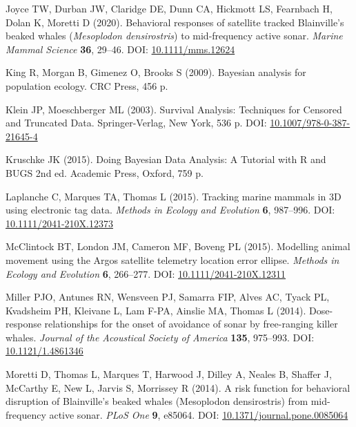\documentclass[
]{article}
\begin{document}
\leavevmode\hypertarget{ref-Joyce2020}{}%
Joyce TW, Durban JW, Claridge DE, Dunn CA, Hickmott LS, Fearnbach H, Dolan K, Moretti D (2020). Behavioral responses of satellite tracked Blainville's beaked whales (\emph{Mesoplodon densirostris}) to mid-frequency active sonar. \emph{Marine Mammal Science} \textbf{36}, 29--46. DOI: \href{https://doi.org/10.1111/mms.12624}{10.1111/mms.12624}

\leavevmode\hypertarget{ref-King2009}{}%
King R, Morgan B, Gimenez O, Brooks S (2009). Bayesian analysis for population ecology. CRC Press, 456 p.

\leavevmode\hypertarget{ref-Klein2003}{}%
Klein JP, Moeschberger ML (2003). Survival Analysis: Techniques for Censored and Truncated Data. Springer-Verlag, New York, 536 p. DOI: \href{https://doi.org/10.1007/978-0-387-21645-4}{10.1007/978-0-387-21645-4}

\leavevmode\hypertarget{ref-Kruschke2010}{}%
Kruschke JK (2015). Doing Bayesian Data Analysis: A Tutorial with R and BUGS 2nd ed. Academic Press, Oxford, 759 p.

\leavevmode\hypertarget{ref-Laplanche2015}{}%
Laplanche C, Marques TA, Thomas L (2015). Tracking marine mammals in 3D using electronic tag data. \emph{Methods in Ecology and Evolution} \textbf{6}, 987--996. DOI: \href{https://doi.org/10.1111/2041-210X.12373}{10.1111/2041-210X.12373}

\leavevmode\hypertarget{ref-McClintock2015}{}%
McClintock BT, London JM, Cameron MF, Boveng PL (2015). Modelling animal movement using the Argos satellite telemetry location error ellipse. \emph{Methods in Ecology and Evolution} \textbf{6}, 266--277. DOI: \href{https://doi.org/10.1111/2041-210X.12311}{10.1111/2041-210X.12311}

\leavevmode\hypertarget{ref-Miller2014}{}%
Miller PJO, Antunes RN, Wensveen PJ, Samarra FIP, Alves AC, Tyack PL, Kvadsheim PH, Kleivane L, Lam F-PA, Ainslie MA, Thomas L (2014). Dose-response relationships for the onset of avoidance of sonar by free-ranging killer whales. \emph{Journal of the Acoustical Society of America} \textbf{135}, 975--993. DOI: \href{https://doi.org/10.1121/1.4861346}{10.1121/1.4861346}

\leavevmode\hypertarget{ref-Moretti2014}{}%
Moretti D, Thomas L, Marques T, Harwood J, Dilley A, Neales B, Shaffer J, McCarthy E, New L, Jarvis S, Morrissey R (2014). A risk function for behavioral disruption of Blainville's beaked whales (Mesoplodon densirostris) from mid-frequency active sonar. \emph{PLoS One} \textbf{9}, e85064. DOI: \href{https://doi.org/10.1371/journal.pone.0085064}{10.1371/journal.pone.0085064}
\end{document}
